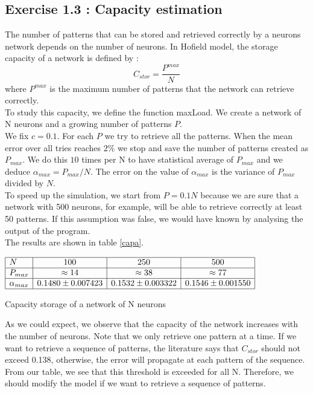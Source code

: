 \subsection{Exercise 1.3 : Capacity estimation}
The number of patterns that can be stored and retrieved correctly by a neurons network depends on the number of neurons. 
In Hofield model, the storage capacity of a network is defined by :
\begin{equation}\nonumber
C_{stor} =\frac{ P^{max}}{N}
\end{equation} 
where $P^{max}$ is the maximum number of patterns that the network can retrieve correctly. \\
To study this capacity, we define the function maxLoad. We create a network of N neurons and a growing number of patterns $P$.  \\
We fix $c=0.1$. For each $P$ we try to retrieve all the patterns. When the mean error over all tries reaches $2\%$ we stop and save the number 
of patterns created as $P_{max}$. We do this $10$ times per N to have statistical average of $P_{max}$ and we deduce $\alpha_{max} = P_{max}/N$. The error on the value of $\alpha_{max}$ is the variance of $P_{max}$ divided by $N$.\\
To speed up the simulation, we start from $P = 0.1 N$ because we are sure that a network with 500 neurons, for example, will be able to
retrieve correctly at least 50 patterns. If this assumption was false, we would have known by analysing the output of the program.\\
The results are shown in table \ref{capa}.  
\begin{table}[h]\label{capa}
\begin{center}
\begin{math}
    \begin{array}{|l|c|c|c|}
    \hline
    N & 100 & 250 & 500 \\ \hline
    P_{max} & \approx 14 & \approx 38 &  \approx 77 \\ \hline
    \alpha_{max} & 0.1480 \pm  0.007423 & 0.1532 \pm  0.003322 &  0.1546 \pm  0.001550 \\ \hline
    \end{array}
\end{math}
\end{center}
\caption{Capacity storage of a network of N neurons }
\end{table}
As we could expect, we observe that the capacity of the network increases with the number of neurons. %
Note that we only retrieve one pattern at a time. If we want to retrieve a sequence of patterns, the literature says that $C_{stor}$ should not exceed 0.138\cite{prof}, otherwise, the error will propagate at each pattern of the sequence. From our table, we see that this threshold is exceeded for all N. Therefore, we should modify the model if we want to retrieve a sequence of patterns. 


